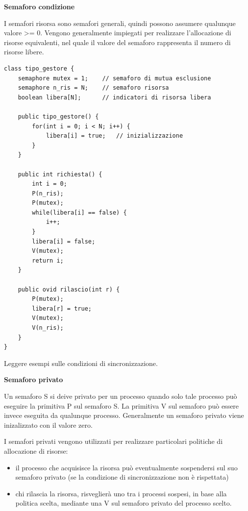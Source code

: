 \documentclass{article}
\begin{document}
\vspace{5mm}
\textbf{Semaforo condizione}

\vspace{3mm}
I semafori risorsa sono semafori generali, quindi possono assumere qualunque valore >= 0. Vengono generalmente impiegati per realizzare l'allocazione di risorse
equivalenti, nel quale il valore del semaforo rappresenta il numero di risorse libere.

\vspace{3mm}
\begin{lstlisting}
class tipo_gestore {
    semaphore mutex = 1;    // semaforo di mutua esclusione
    semaphore n_ris = N;    // semaforo risorsa
    boolean libera[N];      // indicatori di risorsa libera

    public tipo_gestore() {
        for(int i = 0; i < N; i++) {
            libera[i] = true;   // inizializzazione
        }
    }

    public int richiesta() {
        int i = 0;
        P(n_ris);
        P(mutex);
        while(libera[i] == false) {
            i++;
        }
        libera[i] = false;
        V(mutex);
        return i;
    }

    public ovid rilascio(int r) {
        P(mutex);
        libera[r] = true;
        V(mutex);
        V(n_ris);
    }
}
\end{lstlisting}

\vspace{3mm}
Leggere esempi sulle condizioni di sincronizzazione.

\vspace{5mm}
\textbf{Semaforo privato}

\vspace{3mm}
Un semaforo S si deive privato per un processo quando solo tale processo può eseguire la primitiva P sul semaforo S. La primitiva V sul semaforo può essere invece eseguita
da qualunque processo. Generalmente un semaforo privato viene inizalizzato con il valore zero.

\vspace{3mm}
I semafori privati vengono utilizzati per realizzare particolari politiche di allocazione di risorse:
\begin{itemize}
    \item il processo che acquisisce la risorsa può eventualmente sospendersi sul suo semaforo privato (se la condizione di sincronizzazione non è rispettata)
    \item chi rilascia la risorsa, risveglierà uno tra i processi sospesi, in base alla politica scelta, mediante una V sul semaforo privato del processo scelto.
\end{itemize}
\end{document}
